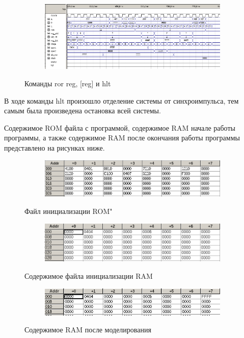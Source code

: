 \begin{figure}[ht]
\centering
  \begin{subfigure}[b]{\textwidth}
    \centering
    \includegraphics[scale=0.65]{pc_wave2_part4}
    \caption{}
  \end{subfigure}
    \caption{Команды ror reg, [reg] и hlt}
\end{figure}

В ходе команды hlt произошло отделение системы от синхроимпульса, тем самым была произведена остановка всей системы.

Содержимое ROM файла с программой, содержимое RAM начале работы программы, а также содержимое RAM после окончания работы программы представлено на рисунках ниже.

\begin{figure}[ht]
\centering
  \begin{subfigure}[b]{\textwidth}
    \centering
    \includegraphics[scale=0.8]{rom2}
    \caption{}
  \end{subfigure}
    \caption{Файл инициализации ROM"}
\end{figure}

\begin{figure}[ht]
\centering
  \begin{subfigure}[b]{\textwidth}
    \centering
    \includegraphics[scale=0.8]{ram21}
    \caption{}
  \end{subfigure}
    \caption{Содержимое файла инициализации RAM}
\end{figure}

\begin{figure}[ht]
\centering
  \begin{subfigure}[b]{\textwidth}
    \centering
    \includegraphics[scale=1.15]{ram22}
    \caption{}
  \end{subfigure}
    \caption{Содержимое RAM после моделирования}
\end{figure}
